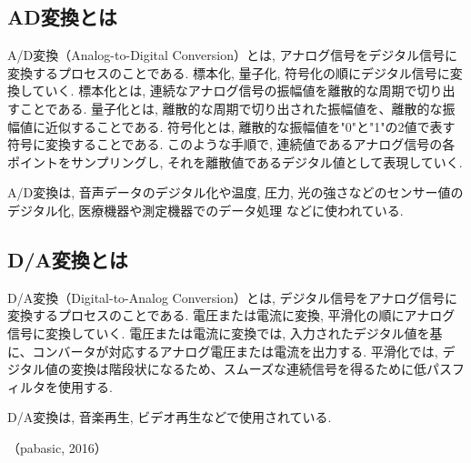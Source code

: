 \documentclass{ltjsarticle} %
\begin{document}
\subsection{AD変換とは}
A/D変換（Analog-to-Digital Conversion）とは, アナログ信号をデジタル信号に変換するプロセスのことである. 
標本化, 量子化, 符号化の順にデジタル信号に変換していく. 
標本化とは, 連続なアナログ信号の振幅値を離散的な周期で切り出すことである. 
量子化とは, 離散的な周期で切り出された振幅値を、離散的な振幅値に近似することである. 
符号化とは, 離散的な振幅値を"0"と"1"の2値で表す符号に変換することである. 
このような手順で, 連続値であるアナログ信号の各ポイントをサンプリングし, それを離散値であるデジタル値として表現していく. 

A/D変換は, 音声データのデジタル化や温度, 圧力, 光の強さなどのセンサー値のデジタル化, 医療機器や測定機器でのデータ処理
などに使われている. 

\subsection{D/A変換とは}
D/A変換（Digital-to-Analog Conversion）とは, デジタル信号をアナログ信号に変換するプロセスのことである. 
電圧または電流に変換, 平滑化の順にアナログ信号に変換していく. 
電圧または電流に変換では, 入力されたデジタル値を基に、コンバータが対応するアナログ電圧または電流を出力する. 
平滑化では, デジタル値の変換は階段状になるため、スムーズな連続信号を得るために低パスフィルタを使用する. 

D/A変換は, 音楽再生, ビデオ再生などで使用されている. 

（pabasic, 2016）
\end{document}

